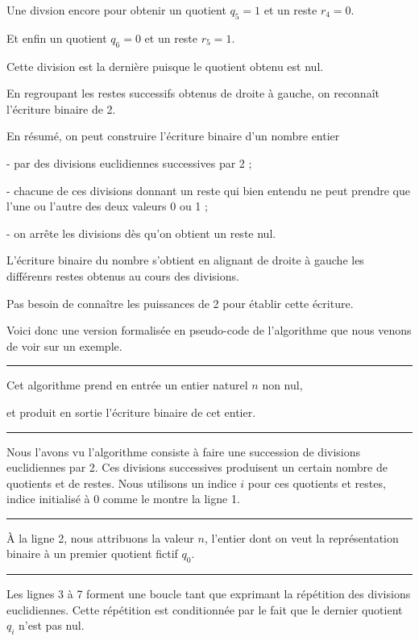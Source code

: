 \change
Une divsion encore pour obtenir un quotient $q_5=1$ et un reste $r_4=0$.

\change
Et enfin un quotient $q_6=0$ et un reste $r_5=1$.

Cette division est la dernière puisque le quotient obtenu est nul.
  
\change
En regroupant les restes successifs obtenus de droite à gauche, on reconnaît l'écriture binaire de 2.


En résumé, on peut construire  l'écriture binaire d'un nombre entier
\change


- par des divisions euclidiennes successives par 2 ;

\change
- chacune de ces divisions donnant un reste qui bien entendu ne peut prendre que l'une ou l'autre des deux valeurs 0 ou 1 ;

\change
- on arrête les divisions dès qu'on obtient un reste nul.

\change

L'écriture binaire du nombre s'obtient en alignant de droite à gauche les différenrs restes obtenus au cours des divisions.

Pas besoin de connaître les puissances de 2 pour établir cette écriture.

\diapo %


Voici donc une version formalisée en pseudo-code de l'algorithme que nous venons de voir sur un exemple.

\hrule\medskip

Cet algorithme prend en entrée un entier naturel $n$ non nul,

et produit en sortie l'écriture binaire de cet entier.

\hrule\medskip

Nous l'avons vu l'algorithme consiste à faire une succession de divisions euclidiennes par 2. Ces divisions successives produisent un certain nombre de quotients et de restes. Nous utilisons un indice $i$ pour ces quotients et restes, indice initialisé à 0 comme le montre la ligne 1.

\hrule\medskip

À la ligne 2, nous attribuons la valeur $n$, l'entier dont on veut la représentation binaire à un premier quotient fictif $q_0$.

\hrule\medskip

Les lignes 3 à 7 forment une boucle tant que exprimant la répétition des divisions euclidiennes. Cette répétition est conditionnée par le fait que le dernier quotient $q_i$ n'est pas nul.

